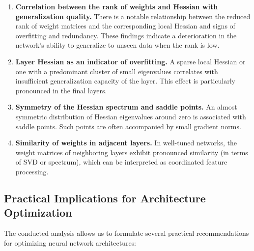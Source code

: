 \documentclass[a4paper,12pt]{article}
\begin{document}
\begin{enumerate}
  \item \textbf{Correlation between the rank of weights and Hessian with generalization quality.} There is a
    notable relationship between the reduced rank of weight matrices and the corresponding local Hessian and
    signs of overfitting and redundancy. These findings indicate a deterioration in the network's ability to
    generalize to unseen data when the rank is low.
  \item \textbf{Layer Hessian as an indicator of overfitting.} A sparse local Hessian or one with a
    predominant cluster of small eigenvalues correlates with insufficient generalization capacity of the
    layer. This effect is particularly pronounced in the final layers.
  \item \textbf{Symmetry of the Hessian spectrum and saddle points.} An almost symmetric distribution of
    Hessian eigenvalues around zero is associated with saddle points. Such points are often accompanied by
    small gradient norms.
  \item \textbf{Similarity of weights in adjacent layers.} In well-tuned networks, the weight matrices of
    neighboring layers exhibit pronounced similarity (in terms of SVD or spectrum), which can be interpreted
    as coordinated feature processing.
\end{enumerate}

\subsection{Practical Implications for Architecture Optimization}

The conducted analysis allows us to formulate several practical recommendations for optimizing neural network
architectures:
\end{document}
